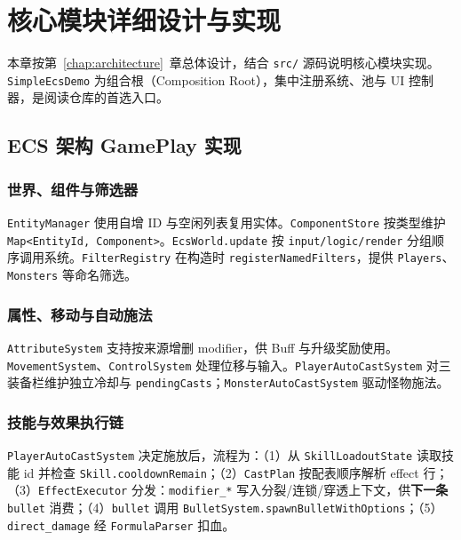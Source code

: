 \chapter{核心模块详细设计与实现}
\label{chap:modules}

本章按第~\ref{chap:architecture}~章总体设计，结合 \texttt{src/} 源码说明核心模块实现。\texttt{SimpleEcsDemo} 为组合根（Composition Root），集中注册系统、池与 UI 控制器，是阅读仓库的首选入口。

\section{ECS 架构 GamePlay 实现}
\label{sec:ecs-impl}

\subsection{世界、组件与筛选器}

\texttt{EntityManager} 使用自增 ID 与空闲列表复用实体。\texttt{ComponentStore} 按类型维护 \texttt{Map<EntityId, Component>}。\texttt{EcsWorld.update} 按 \texttt{input/logic/render} 分组顺序调用系统\cite{gregory2018game}。\texttt{FilterRegistry} 在构造时 \texttt{registerNamedFilters}，提供 \texttt{Players}、\texttt{Monsters} 等命名筛选。

\subsection{属性、移动与自动施法}

\texttt{AttributeSystem} 支持按来源增删 modifier，供 Buff 与升级奖励使用。\texttt{MovementSystem}、\texttt{ControlSystem} 处理位移与输入。\texttt{PlayerAutoCastSystem} 对三装备栏维护独立冷却与 \texttt{pendingCasts}；\texttt{MonsterAutoCastSystem} 驱动怪物施法。

\subsection{技能与效果执行链}

\texttt{PlayerAutoCastSystem} 决定施放后，流程为：（1）从 \texttt{SkillLoadoutState} 读取技能 id 并检查 \texttt{Skill.cooldownRemain}；（2）\texttt{CastPlan} 按配表顺序解析 effect 行；（3）\texttt{EffectExecutor} 分发：\texttt{modifier\_*} 写入分裂/连锁/穿透上下文，供\textbf{下一条} \texttt{bullet} 消费；（4）\texttt{bullet} 调用 \texttt{BulletSystem.spawnBulletWithOptions}；（5）\texttt{direct\_damage} 经 \texttt{FormulaParser} 扣血。

